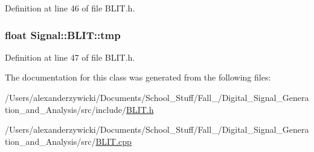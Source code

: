 Definition at line 46 of file B\+L\+I\+T.\+h.

\hypertarget{class_signal_1_1_b_l_i_t_aad33fcad866b50f9596d7b54eef4f27a}{
\subsubsection[{tmp}]{\setlength{\rightskip}{0pt plus 5cm}float Signal\+::\+B\+L\+I\+T\+::tmp\hspace{0.3cm}{\ttfamily [protected]}}}\label{class_signal_1_1_b_l_i_t_aad33fcad866b50f9596d7b54eef4f27a}


Definition at line 47 of file B\+L\+I\+T.\+h.



The documentation for this class was generated from the following files\+:\begin{DoxyCompactItemize}
\item 
/\+Users/alexanderzywicki/\+Documents/\+School\+\_\+\+Stuff/\+Fall\+\_/\+Digital\+\_\+\+Signal\+\_\+\+Generation\+\_\+and\+\_\+\+Analysis/src/include/\hyperlink{_b_l_i_t_8h}{B\+L\+I\+T.\+h}\item 
/\+Users/alexanderzywicki/\+Documents/\+School\+\_\+\+Stuff/\+Fall\+\_/\+Digital\+\_\+\+Signal\+\_\+\+Generation\+\_\+and\+\_\+\+Analysis/src/\hyperlink{_b_l_i_t_8cpp}{B\+L\+I\+T.\+cpp}\end{DoxyCompactItemize}
